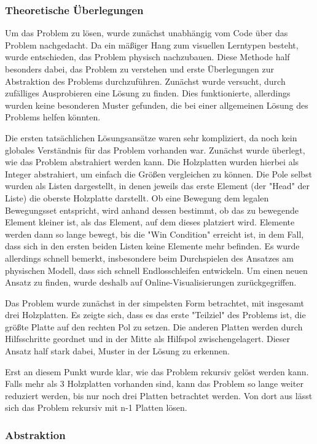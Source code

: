 \subsubsection{Theoretische Überlegungen}
Um das Problem zu lösen, wurde zunächst unabhängig vom Code über das Problem nachgedacht. Da ein mäßiger Hang zum visuellen Lerntypen besteht, wurde entschieden, das Problem physisch nachzubauen. Diese Methode half besonders dabei, das Problem zu verstehen und erste Überlegungen zur Abstraktion des Problems durchzuführen. Zunächst wurde versucht, durch zufälliges Ausprobieren eine Lösung zu finden. Dies funktionierte, allerdings wurden keine besonderen Muster gefunden, die bei einer allgemeinen Lösung des Problems helfen könnten.

Die ersten tatsächlichen Lösungsansätze waren sehr kompliziert, da noch kein globales Verständnis für das Problem vorhanden war. Zunächst wurde überlegt, wie das Problem abstrahiert werden kann.
Die Holzplatten wurden hierbei als Integer abstrahiert, um einfach die Größen vergleichen zu können. Die Pole selbst wurden als Listen dargestellt, in denen jeweils das erste Element (der "Head" der Liste) die oberste Holzplatte darstellt.
Ob eine Bewegung dem legalen Bewegungsset entspricht, wird anhand dessen bestimmt, ob das zu bewegende Element kleiner ist, als das Element, auf dem dieses platziert wird. Elemente werden dann so lange bewegt, bis die "Win Condition" erreicht ist, in dem Fall, dass sich in den ersten beiden Listen keine Elemente mehr befinden.
Es wurde allerdings schnell bemerkt, insbesondere beim Durchspielen des Ansatzes am physischen Modell, dass sich schnell Endlosschleifen entwickeln. Um einen neuen Ansatz zu finden, wurde deshalb auf Online-Visualisierungen zurückgegriffen.

Das Problem wurde zunächst in der simpelsten Form betrachtet, mit insgesamt drei Holzplatten. Es zeigte sich, dass es das erste "Teilziel" des Problems ist, die größte Platte auf den rechten Pol zu setzen. Die anderen Platten werden durch Hilfsschritte geordnet und in der Mitte als Hilfspol zwischengelagert. Dieser Ansatz half stark dabei, Muster in der Lösung zu erkennen.

Erst an diesem Punkt wurde klar, wie das Problem rekursiv gelöst werden kann. Falls mehr als 3 Holzplatten vorhanden sind, kann das Problem so lange weiter reduziert werden, bis nur noch drei Platten betrachtet werden. Von dort aus lässt sich das Problem rekursiv mit n-1 Platten lösen.

\subsubsection{Abstraktion}

